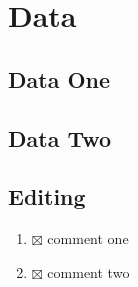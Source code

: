 \section{Data}

\subsection{Data One}


\subsection{Data Two}


\subsection{Editing}
\begin{enumerate}
  \item $\boxtimes$ comment one
  \item $\boxtimes$ comment two
\end{enumerate}
